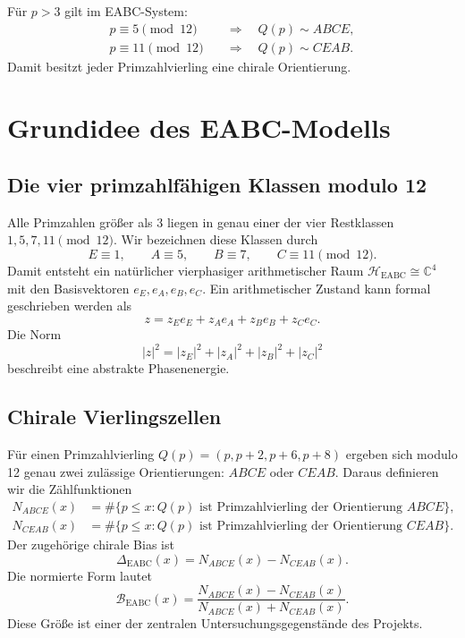 \documentclass[11pt,a4paper,bibliography=totoc]{scrartcl}
\begin{document}
	Für $p > 3$ gilt im EABC-System:
	\begin{align}
		p \equiv 5 \pmod{12} \quad &\Rightarrow \quad Q(p) \sim ABCE, \\
		p \equiv 11 \pmod{12} \quad &\Rightarrow \quad Q(p) \sim CEAB.
	\end{align}
	Damit besitzt jeder Primzahlvierling eine chirale Orientierung.
	
	\section{Grundidee des EABC-Modells}
	
	\subsection{Die vier primzahlfähigen Klassen modulo 12}
	Alle Primzahlen größer als 3 liegen in genau einer der vier Restklassen $1, 5, 7, 11 \pmod{12}$. Wir bezeichnen diese Klassen durch
	\[
	E \equiv 1, \qquad A \equiv 5, \qquad B \equiv 7, \qquad C \equiv 11 \pmod{12}.
	\]
	Damit entsteht ein natürlicher vierphasiger arithmetischer Raum $\mathcal{H}_{\mathrm{EABC}} \cong \mathbb{C}^4$ mit den Basisvektoren $e_E, e_A, e_B, e_C$. Ein arithmetischer Zustand kann formal geschrieben werden als
	\[
	z = z_E e_E + z_A e_A + z_B e_B + z_C e_C.
	\]
	Die Norm
	\[
	|z|^2 = |z_E|^2 + |z_A|^2 + |z_B|^2 + |z_C|^2
	\]
	beschreibt eine abstrakte Phasenenergie.
	
	\subsection{Chirale Vierlingszellen}
	Für einen Primzahlvierling $Q(p) = (p, p+2, p+6, p+8)$ ergeben sich modulo 12 genau zwei zulässige Orientierungen: $ABCE$ oder $CEAB$. Daraus definieren wir die Zählfunktionen
	\begin{align}
		N_{ABCE}(x) &= \# \{p \leq x : Q(p) \text{ ist Primzahlvierling der Orientierung } ABCE\}, \\
		N_{CEAB}(x) &= \# \{p \leq x : Q(p) \text{ ist Primzahlvierling der Orientierung } CEAB\}.
	\end{align}
	Der zugehörige chirale Bias ist
	\[
	\Delta_{\mathrm{EABC}}(x) = N_{ABCE}(x) - N_{CEAB}(x).
	\]
	Die normierte Form lautet
	\[
	\mathcal{B}_{\mathrm{EABC}}(x) = \frac{N_{ABCE}(x) - N_{CEAB}(x)}{N_{ABCE}(x) + N_{CEAB}(x)}.
	\]
	Diese Größe ist einer der zentralen Untersuchungsgegenstände des Projekts.
	
\end{document}
